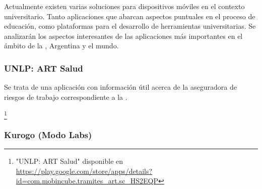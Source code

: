 Actualmente existen varias soluciones para dispositivos móviles en el contexto
universitario. Tanto aplicaciones que abarcan aspectos puntuales en el proceso
de educación, como plataformas para el desarrollo de herramientas
universitarias. Se analizarán los aspectos interesantes de las aplicaciones más
importantes en el ámbito de la \unlp, Argentina y el mundo.

\subsubsection{UNLP: ART Salud}
\label{aplicaciones_existentes_unlp_art_salud}

Se trata de una aplicación con información útil acerca de la aseguradora de riesgos de trabajo correspondiente a la \unlp. 

\footnote{"UNLP: ART Salud" disponible en
\url{https://play.google.com/store/apps/details?id=com.mobincube.tramites_art.sc_HS2EQP}}


\subsubsection{Kurogo (Modo Labs)}
\label{aplicaciones_existentes_kurogo}


